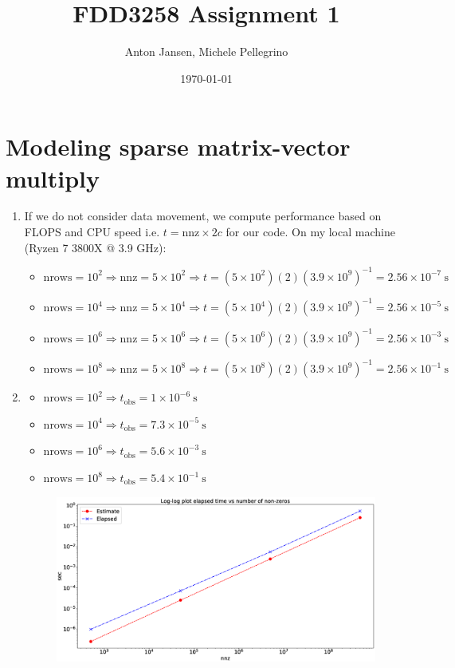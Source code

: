 \documentclass[a4paper]{article}
\title{FDD3258 Assignment 1}
\date{\today}
\author{Anton Jansen, Michele Pellegrino}
\begin{document}
\maketitle

\section{Modeling sparse matrix-vector multiply}

\begin{enumerate}
    \setlength\itemsep{0.01em}
    \item If we do not consider data movement, we compute performance based on FLOPS and CPU speed i.e. $t = \text{nnz} \times 2c$ for our code. On my local machine (Ryzen 7 3800X @ 3.9 GHz):
    \begin{itemize}
        \setlength\itemsep{0.01em}
        \item $\text{nrows} = 10^2 \Rightarrow \text{nnz} = 5 \times 10^2 \Rightarrow t = (5 \times 10^2)(2)(3.9\times 10^9)^{-1} = 2.56 \times 10^{-7} \ \text{s}$
        \item $\text{nrows} = 10^4 \Rightarrow \text{nnz} = 5 \times 10^4 \Rightarrow t = (5 \times 10^4)(2)(3.9\times 10^9)^{-1} = 2.56 \times 10^{-5} \ \text{s}$
        \item $\text{nrows} = 10^6 \Rightarrow \text{nnz} = 5 \times 10^6 \Rightarrow t = (5 \times 10^6)(2)(3.9\times 10^9)^{-1} = 2.56 \times 10^{-3} \ \text{s}$
        \item $\text{nrows} = 10^8 \Rightarrow \text{nnz} = 5 \times 10^8 \Rightarrow t = (5 \times 10^8)(2)(3.9\times 10^9)^{-1} = 2.56 \times 10^{-1} \ \text{s}$
    \end{itemize}
    \item \begin{itemize}
          \setlength\itemsep{0.01em}
              \item $\text{nrows} = 10^2 \Rightarrow t_\text{obs} = 1 \times 10^{-6} \ \text{s}$
              \item $\text{nrows} = 10^4 \Rightarrow t_\text{obs} = 7.3 \times 10^{-5} \ \text{s}$
              \item $\text{nrows} = 10^6 \Rightarrow t_\text{obs} = 5.6 \times 10^{-3} \ \text{s}$
              \item $\text{nrows} = 10^8 \Rightarrow t_\text{obs} = 5.4 \times 10^{-1} \ \text{s}$
          \end{itemize}
    \begin{figure}[ht!]
        \centering
        \includegraphics[scale=0.25]{nnz_time.eps}

\end{figure}
\end{enumerate}
\end{document}
